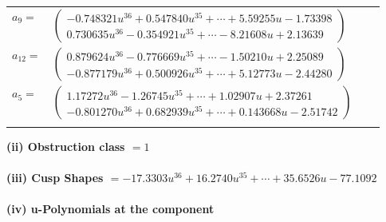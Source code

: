 \documentclass[1p]{elsarticle_modified}
\theoremstyle{definition}
\begin{document}
\begin{tabular}{m{7pt} m{180pt} m{7pt} m{180pt} }
\flushright $a_{9}=$&$\begin{pmatrix}-0.748321 u^{36}+0.547840 u^{35}+\cdots+5.59255 u-1.73398\\0.730635 u^{36}-0.354921 u^{35}+\cdots-8.21608 u+2.13639\end{pmatrix}$ \\
\flushright $a_{12}=$&$\begin{pmatrix}0.879624 u^{36}-0.776669 u^{35}+\cdots-1.50210 u+2.25089\\-0.877179 u^{36}+0.500926 u^{35}+\cdots+5.12773 u-2.44280\end{pmatrix}$ \\
\flushright $a_{5}=$&$\begin{pmatrix}1.17272 u^{36}-1.26745 u^{35}+\cdots+1.02907 u+2.37261\\-0.801270 u^{36}+0.682939 u^{35}+\cdots+0.143668 u-2.51742\end{pmatrix}$\\&\end{tabular}
\flushleft \textbf{(ii) Obstruction class $= 1$}\\~\\
\flushleft \textbf{(iii) Cusp Shapes $= -17.3303 u^{36}+16.2740 u^{35}+\cdots+35.6526 u-77.1092$}\\~\\
\newpage\renewcommand{\arraystretch}{1}
\flushleft \textbf{(iv) u-Polynomials at the component}\newline \\
\end{document}
